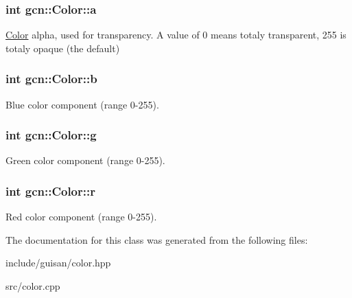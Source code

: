 \subsubsection[{\texorpdfstring{a}{a}}]{\setlength{\rightskip}{0pt plus 5cm}int gcn\+::\+Color\+::a}\hypertarget{classgcn_1_1Color_a46e7ab30d365efc4314368e01ffd6dbf}{}\label{classgcn_1_1Color_a46e7ab30d365efc4314368e01ffd6dbf}
\hyperlink{classgcn_1_1Color}{Color} alpha, used for transparency. A value of 0 means totaly transparent, 255 is totaly opaque (the default) 
\subsubsection[{\texorpdfstring{b}{b}}]{\setlength{\rightskip}{0pt plus 5cm}int gcn\+::\+Color\+::b}\hypertarget{classgcn_1_1Color_a92f745d8f763ef16dcda11a03c44437f}{}\label{classgcn_1_1Color_a92f745d8f763ef16dcda11a03c44437f}
Blue color component (range 0-\/255). 
\subsubsection[{\texorpdfstring{g}{g}}]{\setlength{\rightskip}{0pt plus 5cm}int gcn\+::\+Color\+::g}\hypertarget{classgcn_1_1Color_a13947bb1b79574cfb71580896a311a33}{}\label{classgcn_1_1Color_a13947bb1b79574cfb71580896a311a33}
Green color component (range 0-\/255). 
\subsubsection[{\texorpdfstring{r}{r}}]{\setlength{\rightskip}{0pt plus 5cm}int gcn\+::\+Color\+::r}\hypertarget{classgcn_1_1Color_a03c8b8fd862f837b5295b3ce28c94a33}{}\label{classgcn_1_1Color_a03c8b8fd862f837b5295b3ce28c94a33}
Red color component (range 0-\/255). 

The documentation for this class was generated from the following files\+:\begin{DoxyCompactItemize}
\item 
include/guisan/color.\+hpp\item 
src/color.\+cpp\end{DoxyCompactItemize}
